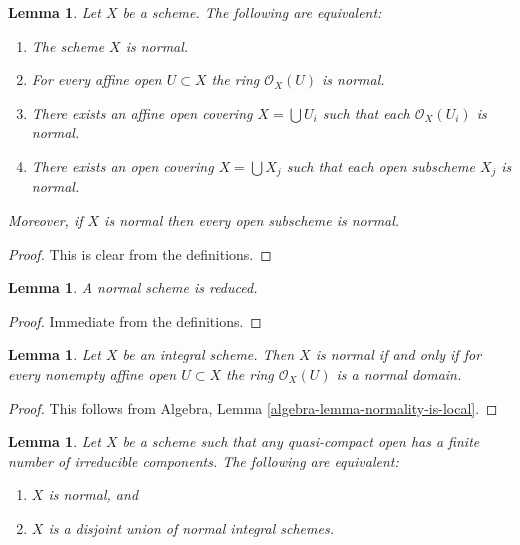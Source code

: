 \documentclass{stacks-project}
\theoremstyle{plain}
\newtheorem{lemma}[subsection]{Lemma}
\theoremstyle{definition}
\theoremstyle{remark}
\numberwithin{equation}{subsection}
\begin{document}
\begin{lemma}
\label{lemma-locally-normal}
Let $X$ be a scheme. The following are equivalent:
\begin{enumerate}
\item The scheme $X$ is normal.
\item For every affine open $U \subset X$ the ring $\mathcal{O}_X(U)$
is normal.
\item There exists an affine open covering $X = \bigcup U_i$ such that
each $\mathcal{O}_X(U_i)$ is normal.
\item There exists an open covering $X = \bigcup X_j$
such that each open subscheme $X_j$ is normal.
\end{enumerate}
Moreover, if $X$ is normal then every open subscheme
is normal.
\end{lemma}

\begin{proof}
This is clear from the definitions.
\end{proof}

\begin{lemma}
\label{lemma-normal-reduced}
A normal scheme is reduced.
\end{lemma}

\begin{proof}
Immediate from the definitions.
\end{proof}

\begin{lemma}
\label{lemma-integral-normal}
Let $X$ be an integral scheme.
Then $X$ is normal if and only if for every nonempty affine open
$U \subset X$ the ring $\mathcal{O}_X(U)$ is a normal domain.
\end{lemma}

\begin{proof}
This follows from
Algebra, Lemma \ref{algebra-lemma-normality-is-local}.
\end{proof}

\begin{lemma}
\label{lemma-normal-locally-finite-nr-irreducibles}
Let $X$ be a scheme such that any quasi-compact open has a finite number
of irreducible components. The following are equivalent:
\begin{enumerate}
\item $X$ is normal, and
\item $X$ is a disjoint union of normal integral schemes.
\end{enumerate}
\end{lemma}
\end{document}
